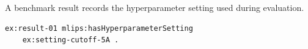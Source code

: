 A benchmark result records the hyperparameter setting used during evaluation.
\begin{lstlisting}[language=turtle]
ex:result-01 mlips:hasHyperparameterSetting
    ex:setting-cutoff-5A .
\end{lstlisting}
